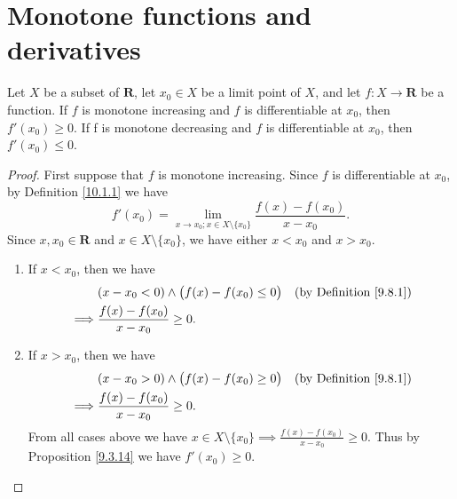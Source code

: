 \section{Monotone functions and derivatives}\label{sec 10.3}

\begin{proposition}\label{10.3.1}
    Let \(X\) be a subset of \(\mathbf{R}\), let \(x_0 \in X\) be a limit point of \(X\), and let \(f : X \to \mathbf{R}\) be a function.
    If \(f\) is monotone increasing and \(f\) is differentiable at \(x_0\), then \(f'(x_0) \geq 0\).
    If f is monotone decreasing and \(f\) is differentiable at \(x_0\), then \(f'(x_0) \leq 0\).
\end{proposition}

\begin{proof}
    First suppose that \(f\) is monotone increasing.
    Since \(f\) is differentiable at \(x_0\), by Definition \ref{10.1.1} we have
    \[
        f'(x_0) = \lim_{x \to x_0 ; x \in X \setminus \{x_0\}} \frac{f(x) - f(x_0)}{x - x_0}.
    \]
    Since \(x, x_0 \in \mathbf{R}\) and \(x \in X \setminus \{x_0\}\), we have either \(x < x_0\) and \(x > x_0\).
    \begin{enumerate}
        \item If \(x < x_0\), then we have
              \begin{align*}
                           & (x - x_0 < 0) \land \big(f(x) - f(x_0) \leq 0\big) & \text{(by Definition \ref{9.8.1})} \\
                  \implies & \frac{f(x) - f(x_0)}{x - x_0} \geq 0.                                                   \\
              \end{align*}
        \item If \(x > x_0\), then we have
              \begin{align*}
                           & (x - x_0 > 0) \land \big(f(x) - f(x_0) \geq 0\big) & \text{(by Definition \ref{9.8.1})} \\
                  \implies & \frac{f(x) - f(x_0)}{x - x_0} \geq 0.                                                   \\
              \end{align*}
              From all cases above we have \(x \in X \setminus \{x_0\} \implies \frac{f(x) - f(x_0)}{x - x_0} \geq 0\).
              Thus by Proposition \ref{9.3.14} we have \(f'(x_0) \geq 0\).
    \end{enumerate}


\end{proof}
